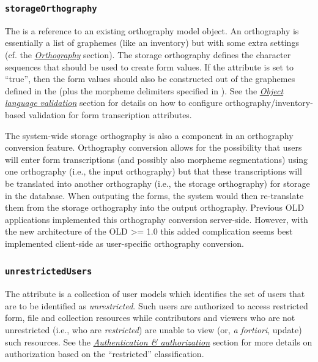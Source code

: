 \documentclass[letterpaper,10pt,english]{sphinxmanual}
\begin{document}
\subsubsection{\texttt{storageOrthography}}
\label{datastructure:storageorthography}
The  is a reference to an existing orthography model
object.  An orthography is essentially a list of graphemes (like an inventory)
but with some extra settings (cf. the {\hyperref[datastructure:orthography-data-structure]{\emph{Orthography}}} section).
The storage orthography defines the character sequences that should be used to
create form  values.  If the 
attribute is set to ``true'', then the form  values should also
be constructed out of the graphemes defined in the  (plus
the morpheme delimiters specified in ).  See the
{\hyperref[interface:object-language-validation]{\emph{Object language validation}}} section for details on how to configure
orthography/inventory-based validation for form transcription attributes.

The system-wide storage orthography is also a component in an orthography
conversion feature.  Orthography conversion allows for the possibility that
users will enter form transcriptions (and possibly also morpheme segmentations)
using one orthography (i.e., the input orthography) but that these
transcriptions will be translated into another orthography (i.e., the storage
orthography) for storage in the database.  When outputing the forms, the system
would then re-translate them from the storage orthography into the output
orthography.  Previous OLD applications implemented this orthography conversion
server-side.  However, with the new architecture of the OLD \textgreater{}= 1.0 this added
complication seems best implemented client-side as user-specific orthography
conversion.


\subsubsection{\texttt{unrestrictedUsers}}
\label{datastructure:unrestrictedusers}
The  attribute is a collection of user models which
identifies the set of users that are to be identified as \emph{unrestricted}.  Such
users are authorized to access restricted form, file and collection resources
while contributors and viewers who are not unrestricted (i.e., who are
\emph{restricted}) are unable to view (or, \emph{a fortiori}, update) such resources.  See
the {\hyperref[interface:auth]{\emph{Authentication \& authorization}}} section for more details on authorization based on the
``restricted'' classification.
\end{document}

